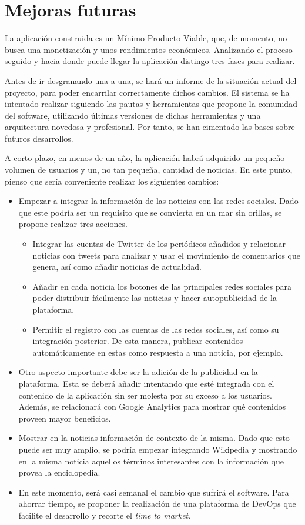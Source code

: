 \section{Mejoras futuras}\label{sec:mejoras_futuras}

La aplicación construida es un Mínimo Producto Viable, que, de momento, no busca una monetización y unos rendimientos económicos. Analizando el proceso seguido y hacia donde puede llegar la aplicación distingo tres fases para realizar.

Antes de ir desgranando una a una, se hará un informe de la situación actual del proyecto, para poder encarrilar correctamente dichos cambios. El sistema se ha intentado realizar siguiendo las pautas y herramientas que propone la comunidad del software, utilizando últimas versiones de dichas herramientas y una arquitectura novedosa y profesional. Por tanto, se han cimentado las bases sobre futuros desarrollos.

A corto plazo, en menos de un año, la aplicación habrá adquirido un pequeño volumen de usuarios y un, no tan pequeña, cantidad de noticias. En este punto, pienso que sería conveniente realizar los siguientes cambios:

\begin{itemize}
    \item Empezar a integrar la información de las noticias con las redes sociales. Dado que este podría ser un requisito que se convierta en un mar sin orillas, se propone realizar tres acciones.
    \begin{itemize}
        \item Integrar las cuentas de Twitter de los periódicos añadidos y relacionar noticias con tweets para analizar y usar el movimiento de comentarios que genera, así como añadir noticias de actualidad.
        \item Añadir en cada noticia los botones de las principales redes sociales para poder distribuir fácilmente las noticias y hacer autopublicidad de la plataforma.
        \item Permitir el registro con las cuentas de las redes sociales, así como su integración posterior. De esta manera, publicar contenidos automáticamente en estas como respuesta a una noticia, por ejemplo.
    \end{itemize}
    \item Otro aspecto importante debe ser la adición de la publicidad en la plataforma. Esta se deberá añadir intentando que esté integrada con el contenido de la aplicación sin ser molesta por su exceso a los usuarios. Además, se relacionará con Google Analytics para mostrar qué contenidos proveen mayor beneficios.
    \item Mostrar en la noticias información de contexto de la misma. Dado que esto puede ser muy amplio, se podría empezar integrando Wikipedia y mostrando en la misma noticia aquellos términos interesantes con la información que provea la enciclopedia.
    \item En este momento, será casi semanal el cambio que sufrirá el software. Para ahorrar tiempo, se proponer la realización de una plataforma de DevOps que facilite el desarrollo y recorte el \textit{time to market}.
\end{itemize}

